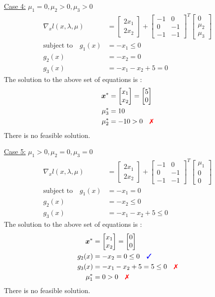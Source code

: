 \documentclass[a4paper,11pt]{article}
\newcommand{\V}[1]{\boldsymbol{#1}}
\newcommand{\mat}[1]{\begin{bmatrix}#1\end{bmatrix}}
\newcommand{\cmark}{{\color{blue}\text{\ding{51}}}}%
\newcommand{\xmark}{{\color{red}\text{\ding{55}}}}%
\begin{document}
\noindent\underline{Case 4:} $\mu_1=0, \mu_2>0, \mu_3>0$
\begin{align*}
 \nabla_x l(x,\lambda,\mu) &= \mat{2x_1\\ 2x_2} +
\mat{-1& 0\\ 0& -1\\-1& -1}^T\mat{0\\ \mu_2\\ \mu_3}\\
% 
 \text{subject to}\quad g_1(x)&=-x_1 \leq 0\\
 g_2(x)&=-x_2 = 0\\
 g_3(x)&= -x_1 -x_2 +5 =0 
\end{align*}
The solution to the above set of equations is :
\begin{align*}
 \V{x}^*&=\mat{x_1\\x_2} = \mat{5\\0}\\
 \mu_3^*&= 10\\
 \mu_2^*&= -10>0 \quad \xmark
\end{align*}
There is no feasible solution.

\noindent\underline{Case 5:} $\mu_1>0, \mu_2=0, \mu_3=0$
\begin{align*}
 \nabla_x l(x,\lambda,\mu) &= \mat{2x_1\\ 2x_2} +
\mat{-1& 0\\ 0& -1\\-1& -1}^T\mat{\mu_1\\ 0\\ 0}\\
% 
 \text{subject to}\quad g_1(x)&=-x_1 = 0\\
 g_2(x)&=-x_2 \leq 0\\
 g_3(x)&= -x_1 -x_2 +5 \leq0 
\end{align*}
The solution to the above set of equations is :
\begin{align*}
 \V{x}^*&=\mat{x_1\\x_2} = \mat{0\\0}\\
 g_2(x)&=-x_2 =0\leq 0 \quad \cmark\\
 g_3(x)&= -x_1 -x_2 +5 = 5 \leq0 \quad \xmark\\
 \mu_1^*&= 0>0 \quad \xmark
\end{align*}
There is no feasible solution.
\end{document}
